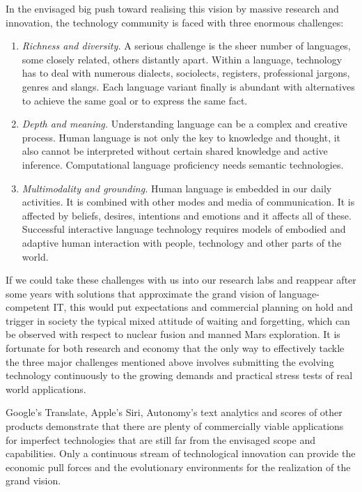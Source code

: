 \documentclass[10pt, plain]{../../metanetpaper}
\begin{document}
\begin{multicols}{2}
In the envisaged big push toward realising this vision by massive research and innovation, the technology community is faced with three enormous challenges:

\begin{enumerate}
\item \emph{Richness and diversity.} A serious challenge is the sheer number of languages, some closely related, others distantly apart. Within a language, technology has to deal with numerous dialects, sociolects, registers, professional jargons, genres and slangs. Each language variant finally is abundant with alternatives to achieve the same goal or to express the same fact.
\item \emph{Depth and meaning.} Understanding language can be a complex and creative process. Human language is not only the key to knowledge and thought, it also cannot be interpreted without certain shared knowledge and active inference. Computational language proficiency needs semantic technologies.
\item \emph{Multimodality and grounding.} Human language is embedded in our daily activities. It is combined with other modes and media of communication. It is affected by beliefs, desires, intentions and emotions and it affects all of these. Successful interactive language technology requires models of embodied and adaptive human interaction with people, technology and other parts of the world.
\end{enumerate}
 
If we could take these challenges with us into our research labs and reappear after some years with solutions that approximate the grand vision of language-competent IT, this would put expectations and commercial planning on hold and trigger in society the typical mixed attitude of waiting and forgetting, which can be observed with respect to nuclear fusion and manned Mars exploration. It is fortunate for both research and economy that the only way to effectively tackle the three major challenges mentioned above involves submitting the evolving technology continuously to the growing demands and practical stress tests of real world applications.

Google's Translate, Apple's Siri, Autonomy's text analytics and scores of other products demonstrate that there are plenty of commercially viable applications for imperfect technologies that are still far from the envisaged scope and capabilities. Only a continuous stream of technological innovation can provide the economic pull forces and the evolutionary environments for the realization of the grand vision. 


\end{multicols}
\end{document}
